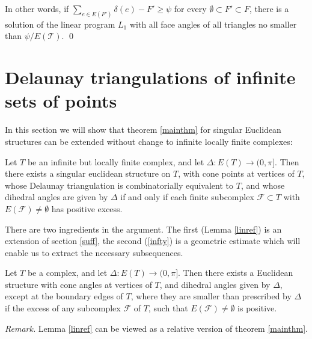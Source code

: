 \documentclass{acmart}
\newcommand{\thm}[2]{\begin{#1} #2 \end{#1}}
\begin{document}
In other words, if $\sum_{e\in E(F')} \delta(e) - F'\geq \psi$ for 
every $\emptyset \subset F'\subset F$, there is a solution of 
the linear program $L_{1}$ with all face angles of all triangles no 
smaller than $\psi/E(\mathcal{T})$.
\qed

\section{Delaunay triangulations of infinite sets of points}
\label{ideal}
In this section we will show that theorem \ref{mainthm} for singular
Euclidean structures can be extended without change to infinite
locally finite complexes: 

\thm{theorem}
{
\label{infmain}
Let $T$ be an infinite but locally finite complex, and let $\Delta:
E(T) \rightarrow (0, \pi]$. Then there exists a singular euclidean
structure on $T$, with cone points at vertices of $T$, whose
Delaunay triangulation is combinatorially equivalent to $T$, and whose
dihedral angles are given by $\Delta$ if and only if each finite
subcomplex $\mathcal{F} \subset T$ with $E(\mathcal{F}) \neq
\emptyset$ has positive excess.
}

There are two ingredients in the argument. The first (Lemma
\ref{linref}) is an extension of section \ref{suff}, the second
(\ref{infty}) is a geometric estimate which will enable us to extract
the necessary subsequences.

\thm{lemma}
{
\label{linref}
Let $T$ be a complex, and let $\Delta: E(T) \rightarrow (0, \pi]$.
Then there exists a Euclidean structure with cone angles at vertices
of $T$, and dihedral angles given by $\Delta$, except at the boundary
edges of $T$, where they are smaller than prescribed by $\Delta$ if
the excess of any subcomplex $\mathcal{F}$ of $T$, such
that $E(\mathcal{F}) \neq \emptyset$ is positive.
}

\medskip\noindent
\textit{Remark.} Lemma \ref{linref} can be viewed as a relative
version of theorem \ref{mainthm}.
\end{document}
